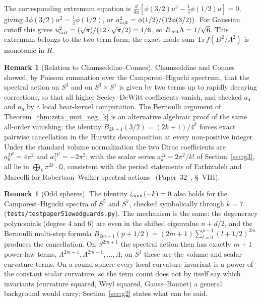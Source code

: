 \documentclass[11pt,a4paper]{article}
\theoremstyle{plain}
\theoremstyle{definition}
\newtheorem{remark}[theorem]{Remark}
\newcommand{\sthree}{S^{3}}
\newcommand{\Rcrit}{R_{\rm crit}}
\renewcommand{\_}{\textunderscore\allowbreak}
\begin{document}
The corresponding extremum equation is
$\frac{d}{du}[\phi(3/2) u^3 - \tfrac{1}{4} \phi(1/2) u] = 0$, giving
$3 \phi(3/2) u^2 = \tfrac{1}{4} \phi(1/2)$, or
$u_{\rm crit}^2 = \phi(1/2)/(12 \phi(3/2))$. For Gaussian cutoff this
gives $u_{\rm crit}^2 = (\sqrt{\pi})/(12 \cdot \sqrt{\pi}/2) = 1/6$,
so $\Rcrit \Lambda = 1/\sqrt{6}$. This extremum belongs to the two-term
form; the exact mode sum $\mathrm{Tr}\, f(D^2/\Lambda^2)$ is monotonic in
$R$.

\begin{remark}[Relation to Chamseddine--Connes]
\label{rem:cc_uncanny}
Chamseddine and Connes~\cite{chamseddine_connes2008_uncanny} showed, by
Poisson summation over the Camporesi--Higuchi spectrum, that the spectral
action on $\sthree$ and on $\sthree \times S^1$ is given by two terms up to
rapidly decaying corrections, so that all higher Seeley--DeWitt
coefficients vanish, and checked $a_4$ and $a_6$ by a local heat-kernel
computation. The Bernoulli argument of Theorem~\ref{thm:zeta_unit_neg_k} is
an alternative algebraic proof of the same all-order vanishing: the
identity $B_{2k+1}(3/2) = (2k{+}1)/4^k$ forces exact pairwise cancellation
in the Hurwitz decomposition at every non-positive integer. Under the
standard volume normalization the two Dirac coefficients are
$a_0^{D^2} = 4\pi^2$ and $a_1^{D^2} = -2\pi^2$; with the scalar series
$a_k^{\Delta} = 2\pi^2/k!$ of Section~\ref{sec:g3}, all lie in
$\bigoplus_k \pi^{2k}\cdot\mathbb{Q}$, consistent with the period
statements of Fathizadeh and Marcolli for Robertson--Walker
spectral actions~\cite{fathizadeh_marcolli2016} (Paper~32~\cite{paper32},
\S~VIII).
\end{remark}

\begin{remark}[Odd spheres]
\label{rem:two_term_uniqueness}
The identity $\zeta_{\rm unit}(-k) = 0$ also holds for the
Camporesi--Higuchi spectra of $S^5$ and $S^7$, checked symbolically
through $k = 7$ (\texttt{tests/test\_paper51\_owed\_guards.py}). The mechanism is the same:
the degeneracy polynomials (degree 4 and 6) are even in the shifted
eigenvalue $n + d/2$, and the Bernoulli multi-step formula
$B_{2m+1}(p + 1/2) = (2m{+}1)\sum_{l=0}^{p-1}(l+1/2)^{2m}$ produces the
cancellation. On $S^{2m+1}$ the spectral action then has exactly $m+1$
power-law terms, $\Lambda^{2m+1}, \Lambda^{2m-1}, \dots, \Lambda$; on
$\sthree$ these are the volume and scalar-curvature terms. On a round
sphere every local curvature invariant is a power of the constant scalar
curvature, so the term count does not by itself say which invariants
(curvature squared, Weyl squared, Gauss--Bonnet) a general background would
carry; Section~\ref{sec:g2} states what can be said.
\end{remark}
\end{document}
